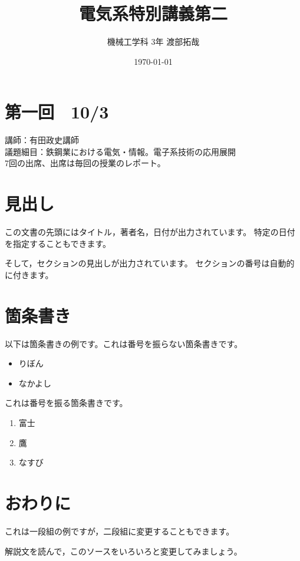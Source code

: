 \documentclass{jsarticle}
\title{電気系特別講義第二}
\author{機械工学科 3年 渡部拓哉}
\date{\today}
\begin{document}
\maketitle

\section{第一回　10/3}
講師：有田政史講師\\
議題細目：鉄鋼業における電気・情報。電子系技術の応用展開\\
7回の出席、出席は毎回の授業のレポート。\\





\section{見出し}

この文書の先頭にはタイトル，著者名，日付が出力されています。
特定の日付を指定することもできます。

そして，セクションの見出しが出力されています。
セクションの番号は自動的に付きます。

\section{箇条書き}

以下は箇条書きの例です。これは番号を振らない箇条書きです。

\begin{itemize}
  \item りぼん
  \item なかよし
\end{itemize}

これは番号を振る箇条書きです。

\begin{enumerate}
  \item 富士
  \item 鷹
  \item なすび
\end{enumerate}

\section{おわりに}

これは一段組の例ですが，二段組に変更することもできます。

解説文を読んで，このソースをいろいろと変更してみましょう。
\end{document}
